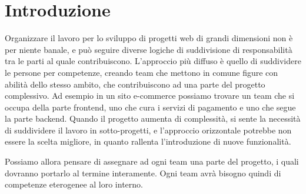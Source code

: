 \chapter{Introduzione}\label{ch:introduzione}
Organizzare il lavoro per lo sviluppo di progetti web di grandi dimensioni non è per niente banale, e
può seguire diverse logiche di suddivisione di responsabilità tra le parti al quale contribuiscono.
L'approccio più diffuso è quello di suddividere le persone per competenze, creando team che mettono in comune
figure con abilità dello stesso ambito, che contribuiscono ad una parte del progetto complessivo.
Ad esempio in un sito e-commerce possiamo trovare un team che si occupa della parte frontend, uno che cura 
i servizi di pagamento e uno che segue la parte backend. Quando il progetto aumenta di complessità, si sente la necessità 
di suddividere il lavoro in sotto-progetti, e l'approccio orizzontale potrebbe non essere la scelta migliore,
in quanto rallenta l'introduzione di nuove funzionalità.

Possiamo allora pensare di assegnare ad ogni team una parte del progetto, i quali dovranno portarlo al termine
interamente. Ogni team avrà bisogno quindi di competenze eterogenee al loro interno.

